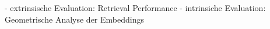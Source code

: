

- extrinsische Evaluation: Retrieval Performance
- intrinsiche Evaluation: Geometrische Analyse der Embeddings